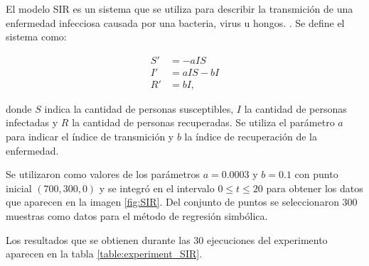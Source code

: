 El modelo SIR es un sistema que se utiliza para describir la transmición de una enfermedad infecciosa causada por una bacteria, virus u hongos. \cite{weiss2013sir}. Se define el sistema como:

\begin{align*}
    S' & = - aIS    \\
    I' & = aIS - bI \\
    R' & = bI,
\end{align*}

donde $S$ indica la cantidad de personas susceptibles, $I$ la cantidad de personas infectadas y $R$ la cantidad de personas recuperadas. Se utiliza el parámetro $a$ para indicar el índice de transmición y $b$ la índice de recuperación de la enfermedad.

Se utilizaron como valores de los parámetros $a = 0.0003$ y $b = 0.1$ con punto inicial $(700, 300, 0)$ y se integró en el intervalo $0 \leq t \leq 20$ para obtener los datos que aparecen en la imagen \ref{fig:SIR}. Del conjunto de puntos se seleccionaron 300 muestras como datos para el método de regresión simbólica.

Los resultados que se obtienen durante las 30 ejecuciones del experimento aparecen en la tabla \ref{table:experiment_SIR}.

